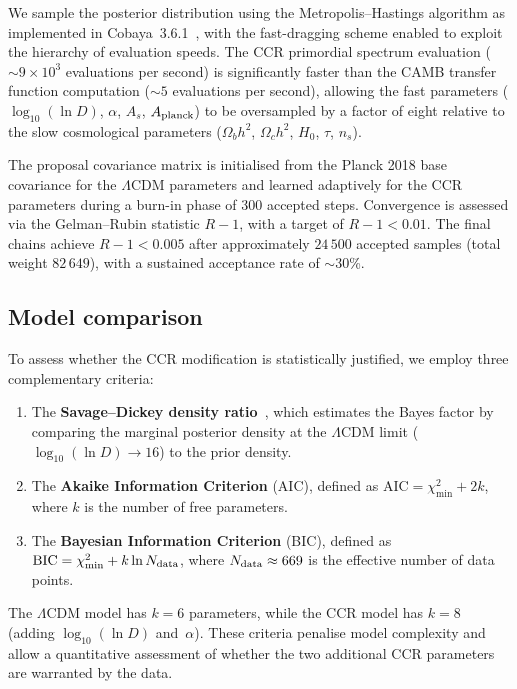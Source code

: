 We sample the posterior distribution using the Metropolis--Hastings
algorithm as implemented in Cobaya~3.6.1~\cite{Torrado:2021}, with the
fast-dragging scheme enabled to exploit the hierarchy of evaluation
speeds. The CCR primordial spectrum evaluation
($\sim 9 \times 10^3$ evaluations per second) is significantly faster
than the CAMB transfer function computation ($\sim 5$ evaluations per
second), allowing the fast parameters ($\log_{10}(\ln D)$, $\alpha$,
$A_s$, $A_{\rm planck}$) to be oversampled by a factor of eight relative
to the slow cosmological parameters ($\Omega_b h^2$, $\Omega_c h^2$,
$H_0$, $\tau$, $n_s$).

The proposal covariance matrix is initialised from the Planck 2018 base
covariance for the $\Lambda$CDM parameters and learned adaptively for
the CCR parameters during a burn-in phase of 300 accepted steps.
Convergence is assessed via the Gelman--Rubin statistic $R - 1$, with
a target of $R - 1 < 0.01$. The final chains achieve $R - 1 < 0.005$ after approximately $24\,500$ accepted samples (total weight $82\,649$), with a sustained acceptance rate of $\sim 30$\%.

\subsection{Model comparison}

To assess whether the CCR modification is statistically justified, we
employ three complementary criteria:
\begin{enumerate}
  \item The \textbf{Savage--Dickey density ratio}~\cite{Dickey:1971},
    which estimates the Bayes factor by comparing the marginal posterior
    density at the $\Lambda$CDM limit ($\log_{10}(\ln D) \to 16$) to
    the prior density.
  \item The \textbf{Akaike Information Criterion} (AIC), defined as
    $\mathrm{AIC} = \chi^2_{\min} + 2k$, where $k$ is the number of
    free parameters.
  \item The \textbf{Bayesian Information Criterion} (BIC), defined as
    $\mathrm{BIC} = \chi^2_{\min} + k \ln N_{\rm data}$, where
    $N_{\rm data} \approx 669$ is the effective number of data points.
\end{enumerate}
The $\Lambda$CDM model has $k = 6$ parameters, while the CCR model has
$k = 8$ (adding $\log_{10}(\ln D)$ and~$\alpha$). These criteria
penalise model complexity and allow a quantitative assessment of whether
the two additional CCR parameters are warranted by the data.
